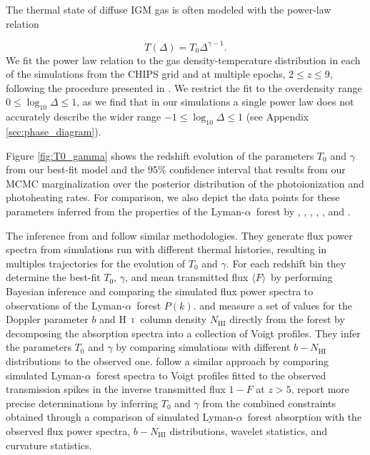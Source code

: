 \documentclass[twocolumn]{aastex62}
\newcommand\Lya{Lyman-$\alpha$}
\def\HI{\hbox{\rm H~$\scriptstyle\rm I$}}
\newcommand\Fmean{$\langle F \rangle$~}
\begin{document}
The thermal state of diffuse IGM gas is often modeled with the power-law relation 
\citep{hui1997a, puchwein2015a, mcquinn2016a}

\begin{equation}
T(\Delta) = T_0 \Delta ^{\gamma - 1}.
\label{eq:rho_T_relation}
\end{equation} 
\noindent
We fit the power law relation to the gas density-temperature 
distribution in each of the simulations from the CHIPS grid and at multiple epochs, $2\leq z \leq 9$, following the procedure presented in \cite{villasenor2021a}. We restrict the fit to the overdensity range $0 \leq \log_{10} \Delta \leq 1$, as we find 
that in our simulations a single power law does not accurately describe the wider range 
$-1 \leq \log_{10} \Delta \leq 1$ (see Appendix \ref{sec:phase_diagram}).

Figure \ref{fig:T0_gamma} shows the redshift evolution of the parameters $T_0$ and $\gamma$ from 
our best-fit model and the 95\% confidence interval
that results from our  MCMC marginalization over the posterior distribution of the photoionization and photoheating rates. For comparison, we also depict the data points for these parameters
inferred from the properties of the \Lya\ forest by
\cite{bolton2014a}, \cite{hiss2018a}, \cite{boera2019a},  \cite{walther2019a},
\cite{gaikwad2020a}, and \cite{gaikwad2020b}.
        
The inference from \cite{boera2019a} and \cite{walther2019a} follow similar methodologies.
They generate flux power spectra from simulations run with different thermal 
histories, resulting in multiples trajectories for the evolution of $T_0$ and $\gamma$.
For each redshift bin they determine the best-fit $T_0$, $\gamma$, and mean transmitted 
flux \Fmean by performing Bayesian inference and comparing the simulated flux power spectra to observations of the \Lya\ forest $P(k)$.    
\cite{bolton2014a}  and \cite{hiss2018a} measure a set of values for the Doppler parameter $b$ and \HI\ column density $N_{\mathrm{HI}}$ directly from the forest by
decomposing the absorption spectra into a collection of Voigt profiles. They infer the parameters $T_0$ and $\gamma$ by comparing simulations with different $b-N_{\mathrm{HI}}$ distributions 
to the observed one. \cite{gaikwad2020a} follow a similar approach by comparing simulated \Lya\ forest spectra to Voigt profiles fitted to the observed transmission spikes in the
inverse transmitted flux $1-F$ at $z>5$.
\cite{gaikwad2020b} report more precise determinations by inferring $T_0$ and $\gamma$ from the combined constraints obtained
through a comparison of simulated \Lya\ forest absorption with the observed flux power spectra, $b-N_{\mathrm{HI}}$ distributions, wavelet statistics, and curvature statistics.
\end{document}
